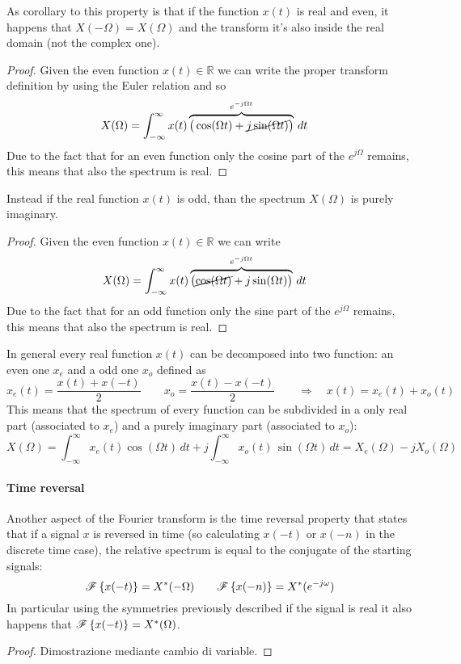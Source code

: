 		As corollary to this property is that if the function $x(t)$ is real and even, it happens that $X(-\Omega) = X(\Omega)$ and the transform it's also inside the real domain (not the complex one).
		\begin{proof}
			Given the even function $x(t) \in \mathds R$ we can write the proper transform definition by using the Euler relation and so
			\begin{align*}
				X(\Omega) & = \int_{-\infty}^\infty x(t) \overbrace{\big(\cos(\Omega t) + \cancel{j \sin(\Omega t)}\big)}^{e ^{-j\Omega t}} \, dt 
			\end{align*}
			Due to the fact that for an even function only the cosine part of the $e^{j\Omega}$ remains, this means that also the spectrum is real.
		\end{proof}
		Instead if the real function $x(t)$ is odd, than the spectrum $X(\Omega)$ is purely imaginary.
		\begin{proof}
			Given the even function $x(t) \in \mathds R$ we can write
			\begin{align*}
				X(\Omega) & = \int_{-\infty}^\infty x(t) \overbrace{\big(\cancel{\cos(\Omega t)} + {j \sin(\Omega t)}\big)}^{e ^{-j\Omega t}} \, dt 
			\end{align*}
			Due to the fact that for an odd function only the sine part of the $e^{j\Omega}$ remains, this means that also the spectrum is real.
		\end{proof}
		In general every real function $x(t)$ can be decomposed into two function: an even one $x_e$ and a odd one $x_o$ defined as
		\[ x_e(t) = \frac{x(t)+x(-t)}{2} \qquad x_o = \frac{x(t)-x(-t)}{2} \qquad \Rightarrow \quad x(t) = x_e(t)+ x_o(t) \]
		This means that the spectrum of every function can be subdivided in a only real part (associated to $x_e$) and a purely imaginary part (associated to $x_o$):
		\[ X(\Omega) = \int_{-\infty}^\infty x_e(t) \cos(\Omega t) \, dt + j \int_{-\infty}^\infty x_o(t)\, \sin(\Omega t)\, dt = X_e(\Omega) - j X_o(\Omega)\]
	
		\paragraph{Time reversal} Another aspect of the Fourier transform is the time reversal property that states that if a signal $x$ is reversed in time (so calculating $x(-t)$ or $x(-n)$ in the discrete time case), the relative spectrum is equal to the conjugate of the starting signals:
		\begin{equation}
			\mathscr{F}\left\{ x(-t) \right\} = X^*(-\Omega) \qquad \mathscr{F}\left\{ x(-n) \right\} =X^*(e^{-j\omega})
		\end{equation}
		In particular using the symmetries previously described if the signal is real it also happens that $\mathscr{F}\left\{ x(-t) \right\} = X^*(\Omega)$.
		\begin{proof}
			Dimostrazione mediante cambio di variable.
		\end{proof}
		
